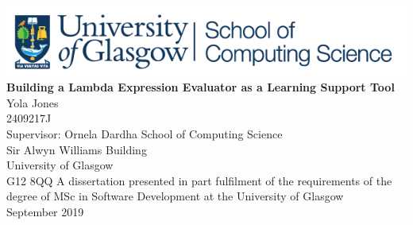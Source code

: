 \documentclass[a4paper,11pt]{report}
\begin{document}
\begin{titlepage}
	\centering
	\includegraphics[scale=0.9]{images/cslogo.png} %
	\vfill
	{\bfseries\Huge
		Building a Lambda Expression Evaluator as a Learning Support Tool\\
	}
	\vskip2cm
	{\huge
		Yola Jones\\
	}
	{\LARGE
		\vskip0.5cm
		2409217J\\
		\vskip0.75cm
		Supervisor: Ornela Dardha
	}
	\vskip1cm
	{\large
		School of Computing Science\\
		Sir Alwyn Williams Building\\
		University of Glasgow\\
		G12 8QQ
	}
	\vskip2cm
	{\Large
		\vskip1cm
		A dissertation presented in part fulfilment of the requirements of the degree of MSc in Software Development at the University of Glasgow\\
		\vskip1cm
		September 2019\\
	}  
	\vfill
	
	
\end{titlepage}
\thispagestyle{empty}
\end{document}
